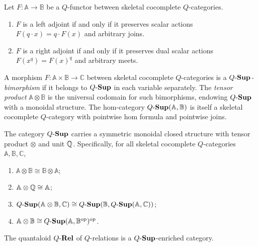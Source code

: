 \documentclass{tac}
\begin{document}
\begin{proposition} \label{prop:adjoint-char}
Let \(F\colon\mathbb{A}\to\mathbb{B}\) be a \(Q\)-functor between skeletal cocomplete \(Q\)-categories.
\begin{enumerate}[label={\rm(\arabic*)}]
\item \(F\) is a left adjoint if and only if it preserves scalar actions \(F(q\cdot x)=q\cdot F(x)\) and arbitrary joins.
\item \(F\) is a right adjoint if and only if it preserves dual scalar actions \(F(x^q)=F(x)^q\) and arbitrary meets.
\end{enumerate}
\end{proposition}

A morphism \(F\colon\mathbb{A}\times\mathbb{B}\to\mathbb{C}\) between skeletal cocomplete \(Q\)-categories is a \emph{\({Q\text{-}\mathbf{Sup}}\)-bimorphism} if it belongs to \({Q\text{-}\mathbf{Sup}}\) in each variable separately. The \emph{tensor product} \(\mathbb{A}\otimes\mathbb{B}\) is the universal codomain for such bimorphisms, endowing \({Q\text{-}\mathbf{Sup}}\) with a monoidal structure. The hom-category \({Q\text{-}\mathbf{Sup}}(\mathbb{A},\mathbb{B})\) is itself a skeletal cocomplete \(Q\)-category with pointwise hom formula and pointwise joins.

\begin{proposition} \label{prop:ccat-monoidal}
The category \({Q\text{-}\mathbf{Sup}}\) carries a symmetric monoidal closed structure with tensor product \(\otimes\) and unit \(\mathbb{Q}\). Specifically, for all skeletal cocomplete \(Q\)-categories \(\mathbb{A},\mathbb{B},\mathbb{C}\),
\begin{enumerate}[label={\rm(\arabic*)}]
\item \(\mathbb{A}\otimes\mathbb{B}\cong\mathbb{B}\otimes\mathbb{A}\);
\item \(\mathbb{A}\otimes\mathbb{Q}\cong\mathbb{A}\);
\item \({Q\text{-}\mathbf{Sup}}(\mathbb{A}\otimes\mathbb{B},\mathbb{C}) \cong {Q\text{-}\mathbf{Sup}}(\mathbb{B},{Q\text{-}\mathbf{Sup}}(\mathbb{A},\mathbb{C}))\);
\item \(\mathbb{A}\otimes\mathbb{B}\cong {Q\text{-}\mathbf{Sup}}(\mathbb{A},\mathbb{B}^\mathrm{op})^\mathrm{op}\).
\end{enumerate}
\end{proposition}

\begin{proposition} \label{prop:qrel-enriched}
The quantaloid \(Q\text{-}\mathbf{Rel}\) of \(Q\)-relations is a \({Q\text{-}\mathbf{Sup}}\)-enriched category.
\end{proposition}
\end{document}
